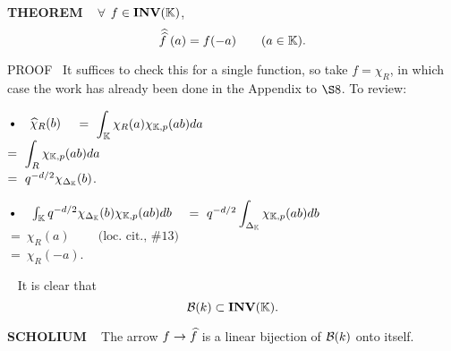 \begin{x}{\small\bf THEOREM} \ %
$\forall$ $f \in \mathbf{INV}(\mathbb{K})$,
\[
\widehat{\widehat{f}\hspace{0.1cm}}(a) = f(-a)	\qquad (a \in \mathbb{K}).
\]

\vspace{0.1cm}

PROOF \  
It suffices to check this for a single function, so take $f = \chi_R$, 
in which case the work has already been done in the Appendix to $\S 8$.  
To review:

\vspace{0.4cm}

\indent\indent$\text{\textbullet} \quad \widehat{\chi}_R(b)$
\indent\indent\indent\indent\quad \  \ $=\  \displaystyle\int_{\mathbb{K}} \chi_R(a) \chi_{\mathbb{K},p} (ab)da$\\
\indent\indent\indent\indent\indent\indent\indent\indent\indent $=\  \displaystyle\int_{R} \chi_{\mathbb{K},p} (ab)da$\\
\indent\indent\indent\indent\indent\indent\indent\indent\indent $=\  q^{-d/2} \chi_{\Delta_{\mathbb{K}}}(b)$.\\

\vspace{0.1cm}

\indent\indent$\text{\textbullet} \quad \int_{\K} q^{-d/2} \chi_{\Delta_\K}(b) \chi_{\K,p} (ab)db \quad $
$ =\  q^{-d/2} \displaystyle\int_{\Delta_{\mathbb{K}}} \chi_{\mathbb{K},p} (ab)db$\\
\indent\indent\indent\indent\indent\indent\indent\indent\indent $=\  \chi_R(a) \qquad \  \text{(loc. cit., $\# 13$)}$\\
\indent\indent\indent\indent\indent\indent\indent\indent\indent $=\  \chi_R(-a)$.

\end{x}

\vspace{0.1cm}

\begin{x}{\small\bf {}} \ %
It is clear that 
\[
\mathcal{B}(k) \subset \mathbf{INV}(\mathbb{K}).
\]
\end{x}

\vspace{0.1cm}

\begin{x}{\small\bf SCHOLIUM} \ %
The arrow $f \rightarrow \widehat{f}$ is a linear bijection of $\mathcal{B}(k)$ onto itself.
\end{x}


